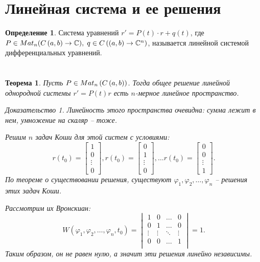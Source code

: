 \documentclass[a5paper, 10pt]{article}
\theoremstyle{definition}
\newtheorem{Def}{Определение}
\theoremstyle{plain}
\newtheorem{Th}{Теорема}
\theoremstyle{remark}
\newtheorem*{Proof}{Доказательство}
\begin{document}
	\section{Линейная система и ее решения}
	\begin{Def}
		Система уравнений $r' = P(t) \cdot r + q(t)$, где $P \in Mat_n(C\left(a,b\right) \rightarrow \mathbb{C}), \; q\in C\left(\left(a,b\right) \rightarrow \mathbb{C}^n\right)$, называется линейной системой дифференциальных уравнений.
	\end{Def}
	
	\section{}
	\begin{Th}
		Пусть $P\in Mat_n\left(C\left(a,b\right)\right)$. Тогда общее решение линейной однородной системы $r' = P(t) r$ есть $n$-мерное линейное пространство.
		\begin{Proof}
			Линейность этого пространства очевидна: сумма лежит в нем, умножение на скаляр -- тоже.
			
			Решим $n$ задач Коши для этой систем с условиями: 
			\[
			r(t_0) = \begin{bmatrix}
				1\\0\\\vdots\\0
			\end{bmatrix},
		r(t_0) = \begin{bmatrix}
			0\\1\\\vdots\\0
		\end{bmatrix},\dots r(t_0) = \begin{bmatrix}
		0\\0\\\vdots\\1
	\end{bmatrix}.
			\] 
			По теореме о существовании решения, существуют $\varphi_1, \varphi_2, \dots, \varphi_n$ -- решения этих задач Коши.
			
			Рассмотрим их Вронскиан:
			\[
			W(\varphi_1, \varphi_2, \dots, \varphi_n, t_0) = \begin{vmatrix}
				1 &0 & \dots &0\\
				0&1&\dots &0\\
				\vdots& \vdots&\ddots &\vdots\\
				0&0&\dots &1\\
			\end{vmatrix}=1.
			\]
			Таким образом, он не равен нулю, а значит эти решения линейно независимы. 
			

\end{Proof}
\end{Th}
\end{document}
